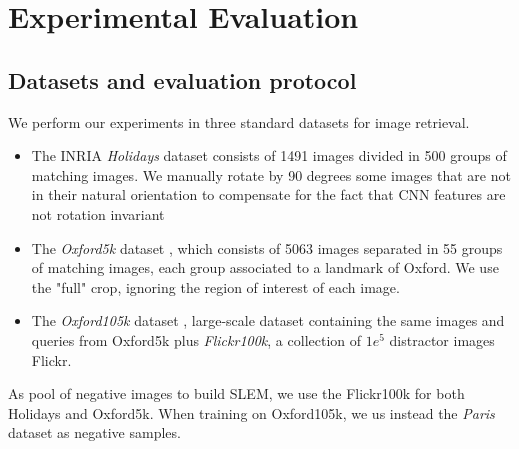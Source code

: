 \section{Experimental Evaluation}
\label{eval}


\subsection{Datasets and evaluation protocol} \label{eval:protocol}
We perform our experiments in three standard datasets for image retrieval. 
\begin{itemize}
    \item The INRIA \emph{Holidays} dataset \cite{holidays} consists of 1491 images divided in 500 groups of matching images. We manually rotate by 90 degrees some images that are not in their natural orientation to compensate for the fact that CNN features are not rotation invariant~\cite{babenko14,Arandjelovic15,RaToCh16}
    \item The \emph{Oxford5k} dataset \cite{oxford}, which consists of 5063 images separated in 55 groups of matching images, each group associated to a landmark of Oxford. We use the "full" crop, ignoring the region of interest of each image.
    \item The \emph{Oxford105k} dataset \cite{oxford}, large-scale dataset containing the same images and queries from Oxford5k plus \emph{Flickr100k}, a collection of $1e^5$ distractor images Flickr.
\end{itemize}
As pool of negative images to build SLEM, we use the Flickr100k for both Holidays and Oxford5k. When training on Oxford105k, we us instead the \emph{Paris} dataset \cite{PhiChIsSiZi08} as negative samples.

